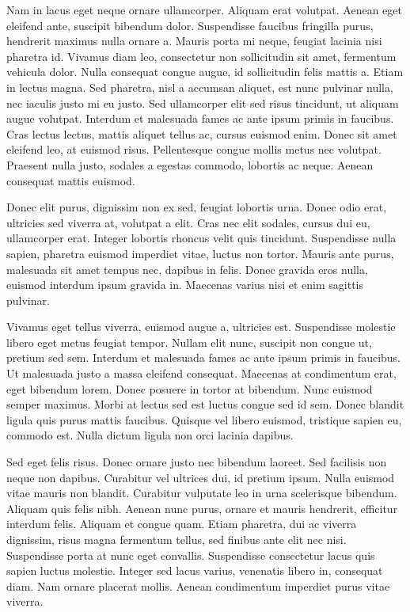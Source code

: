 \documentclass{homework}
\begin{document}
Nam in lacus eget neque ornare ullamcorper. Aliquam erat volutpat. Aenean eget eleifend ante, suscipit bibendum dolor. Suspendisse faucibus fringilla purus, hendrerit maximus nulla ornare a. Mauris porta mi neque, feugiat lacinia nisi pharetra id. Vivamus diam leo, consectetur non sollicitudin sit amet, fermentum vehicula dolor. Nulla consequat congue augue, id sollicitudin felis mattis a. Etiam in lectus magna. Sed pharetra, nisl a accumsan aliquet, est nunc pulvinar nulla, nec iaculis justo mi eu justo. Sed ullamcorper elit sed risus tincidunt, ut aliquam augue volutpat. Interdum et malesuada fames ac ante ipsum primis in faucibus. Cras lectus lectus, mattis aliquet tellus ac, cursus euismod enim. Donec sit amet eleifend leo, at euismod risus. Pellentesque congue mollis metus nec volutpat. Praesent nulla justo, sodales a egestas commodo, lobortis ac neque. Aenean consequat mattis euismod.

Donec elit purus, dignissim non ex sed, feugiat lobortis urna. Donec odio erat, ultricies sed viverra at, volutpat a elit. Cras nec elit sodales, cursus dui eu, ullamcorper erat. Integer lobortis rhoncus velit quis tincidunt. Suspendisse nulla sapien, pharetra euismod imperdiet vitae, luctus non tortor. Mauris ante purus, malesuada sit amet tempus nec, dapibus in felis. Donec gravida eros nulla, euismod interdum ipsum gravida in. Maecenas varius nisi et enim sagittis pulvinar.

Vivamus eget tellus viverra, euismod augue a, ultricies est. Suspendisse molestie libero eget metus feugiat tempor. Nullam elit nunc, suscipit non congue ut, pretium sed sem. Interdum et malesuada fames ac ante ipsum primis in faucibus. Ut malesuada justo a massa eleifend consequat. Maecenas at condimentum erat, eget bibendum lorem. Donec posuere in tortor at bibendum. Nunc euismod semper maximus. Morbi at lectus sed est luctus congue sed id sem. Donec blandit ligula quis purus mattis faucibus. Quisque vel libero euismod, tristique sapien eu, commodo est. Nulla dictum ligula non orci lacinia dapibus.

Sed eget felis risus. Donec ornare justo nec bibendum laoreet. Sed facilisis non neque non dapibus. Curabitur vel ultrices dui, id pretium ipsum. Nulla euismod vitae mauris non blandit. Curabitur vulputate leo in urna scelerisque bibendum. Aliquam quis felis nibh. Aenean nunc purus, ornare et mauris hendrerit, efficitur interdum felis. Aliquam et congue quam. Etiam pharetra, dui ac viverra dignissim, risus magna fermentum tellus, sed finibus ante elit nec nisi. Suspendisse porta at nunc eget convallis. Suspendisse consectetur lacus quis sapien luctus molestie. Integer sed lacus varius, venenatis libero in, consequat diam. Nam ornare placerat mollis. Aenean condimentum imperdiet purus vitae viverra.
\end{document}
